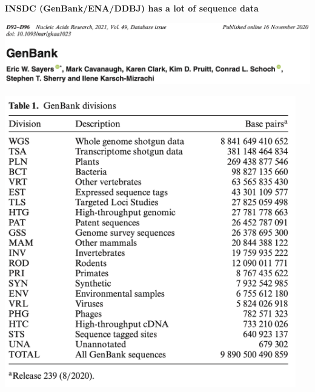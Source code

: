 \documentclass[landscape]{slides}
\begin{document}
\begin{slide}
\begin{center}
\textbf{INSDC (GenBank/ENA/DDBJ) has a lot of sequence data}

\includegraphics[width=9in]{figs/genbank-2020-title}

\includegraphics[width=5in]{figs/genbank-2020-table}

\end{center}

\vfill
\end{slide}
\end{document}
